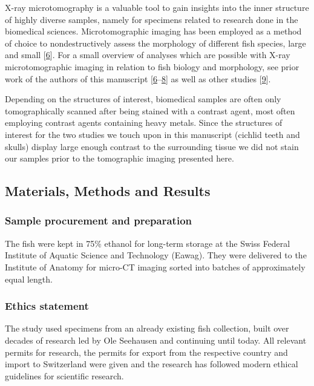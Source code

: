 X-ray microtomography is a valuable tool to gain insights into the inner structure of highly diverse samples, namely for specimens related to research done in the biomedical sciences.
Microtomographic imaging has been employed as a method of choice to nondestructively assess the morphology of different fish species, large and small {[}\protect\hyperlink{ref-19h9vxsYG}{6}{]}.
For a small overview of analyses which are possible with X-ray microtomographic imaging in relation to fish biology and morphology, see prior work of the authors of this manuscript {[}\protect\hyperlink{ref-19h9vxsYG}{6}--\protect\hyperlink{ref-BDrCSu8p}{8}{]} as well as other studies {[}\protect\hyperlink{ref-3rxGCEvJ}{9}{]}.

Depending on the structures of interest, biomedical samples are often only tomographically scanned after being stained with a contrast agent, most often employing contrast agents containing heavy metals.
Since the structures of interest for the two studies we touch upon in this manuscript (cichlid teeth and skulls) display large enough contrast to the surrounding tissue we did not stain our samples prior to the tomographic imaging presented here.

\hypertarget{materials-methods-and-results}{%
\subsection{Materials, Methods and Results}\label{materials-methods-and-results}}

\hypertarget{sample-procurement-and-preparation}{%
\subsubsection{Sample procurement and preparation}\label{sample-procurement-and-preparation}}

The fish were kept in 75\% ethanol for long-term storage at the Swiss Federal Institute of Aquatic Science and Technology (Eawag).
They were delivered to the Institute of Anatomy for micro-CT imaging sorted into batches of approximately equal length.

\hypertarget{ethics-statement}{%
\subsubsection{Ethics statement}\label{ethics-statement}}

The study used specimens from an already existing fish collection, built over decades of research led by Ole Seehausen and continuing until today.
All relevant permits for research, the permits for export from the respective country and import to Switzerland were given and the research has followed modern ethical guidelines for scientific research.

